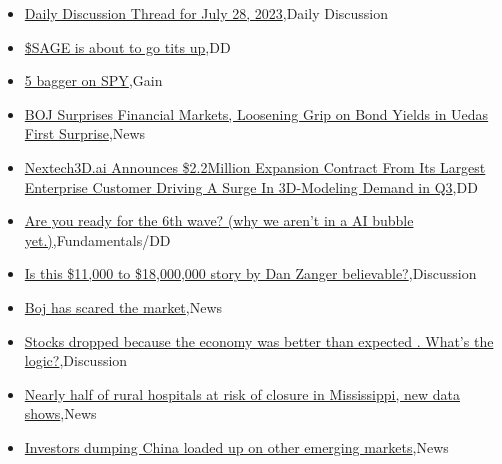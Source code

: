 \documentclass{article}%
\begin{document}
%
\begin{itemize}%
\item%
\href{https://reddit.com/r/wallstreetbets/comments/15bt3q9/daily\_discussion\_thread\_for\_july\_28\_2023/}{Daily Discussion Thread for July 28, 2023},Daily Discussion%
\item%
\href{https://reddit.com/r/wallstreetbets/comments/15bpqei/sage\_is\_about\_to\_go\_tits\_up/}{\$SAGE is about to go tits up},DD%
\item%
\href{https://reddit.com/r/wallstreetbets/comments/15bp8dh/5\_bagger\_on\_spy/}{5 bagger on SPY},Gain%
\item%
\href{https://reddit.com/r/wallstreetbets/comments/15bmrzh/boj\_surprises\_financial\_markets\_loosening\_grip\_on/}{BOJ Surprises Financial Markets, Loosening Grip on Bond Yields in Uedas First Surprise},News%
\item%
\href{https://reddit.com/r/Baystreetbets/comments/15b5419/nextech3dai\_announces\_22million\_expansion/}{Nextech3D.ai Announces \$2.2Million Expansion Contract From Its Largest Enterprise Customer Driving A Surge In 3D-Modeling Demand in Q3},DD%
\item%
\href{https://reddit.com/r/StockMarket/comments/15brykk/are\_you\_ready\_for\_the\_6th\_wave\_why\_we\_arent\_in\_a/}{Are you ready for the 6th wave? (why we aren't in a AI bubble yet.)},Fundamentals/DD%
\item%
\href{https://reddit.com/r/StockMarket/comments/15bojsy/is\_this\_11000\_to\_18000000\_story\_by\_dan\_zanger/}{Is this \$11,000 to \$18,000,000 story by Dan Zanger believable?},Discussion%
\item%
\href{https://reddit.com/r/StockMarket/comments/15bit1a/boj\_has\_scared\_the\_market/}{Boj has scared the market},News%
\item%
\href{https://reddit.com/r/StockMarket/comments/15bi3im/stocks\_dropped\_because\_the\_economy\_was\_better/}{Stocks dropped because the economy was better than expected . What's the logic?},Discussion%
\item%
\href{https://reddit.com/r/Economics/comments/15bhw9d/nearly\_half\_of\_rural\_hospitals\_at\_risk\_of\_closure/}{Nearly half of rural hospitals at risk of closure in Mississippi, new data shows},News%
\item%
\href{https://reddit.com/r/Economics/comments/15bck3f/investors\_dumping\_china\_loaded\_up\_on\_other/}{Investors dumping China loaded up on other emerging markets},News%
\end{itemize}%
\end{document}

